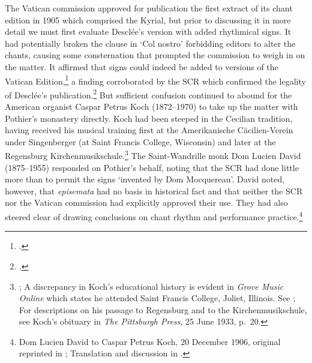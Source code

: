 %
The Vatican commission approved for publication the first extract of its chant edition in 1905 which comprised the Kyrial, but prior to discussing it in more detail we must first evaluate Desclée's version with added rhythmical signs.
It had potentially broken the clause in `Col nostro' forbidding editors to alter the chants, causing some consternation that prompted the commission to weigh in on the matter.
It affirmed that signs could indeed be added to versions of the Vatican Edition,\footcites[286]{CombeHistoirerestaurationchant1969}[253]{CombeRestorationGregorianChant2003} a finding corroborated by the SCR which confirmed the legality of Desclée's publication.\footcite[158--9]{BergeronDecadentEnchantmentsRevival1998}
But sufficient confusion continued to abound for the American organist Caspar Petrus Koch (1872--1970) to take up the matter with Pothier's monastery directly.
Koch had been steeped in the Cecilian tradition, having received his musical training first at the Amerikanische Cäcilien-Verein under Singenberger (at Saint Francis College, Wisconsin) and later at the Regensburg Kirchenmusikschule.\footnote{\cite[198--200]{SkerisMusicasacraArchdiocese2010}; A discrepancy in Koch's educational history is evident in \emph{Grove Music Online} which states he attended Saint Francis College, Joliet, Illinois. See \cite{GotwalsKochCaspar}; For descriptions on his passage to Regensburg and to the Kirchenmusikschule, see Koch's obituary in \emph{The Pittsburgh Press}, 25 June 1933, p.~20.}
The Saint-Wandrille monk Dom Lucien David (1875--1955) responded on Pothier's behalf, noting that the SCR had done little more than to permit the signs `invented by Dom Mocquereau'.
David noted, however, that \emph{episemata} had no basis in historical fact and that neither the SCR nor the Vatican commission had explicitly approved their use.
They had also steered clear of drawing conclusions on chant rhythm and performance practice.\footnote{Dom Lucien David to Caspar Petrus Koch, 20 December 1906, original reprinted in \cite[46--7]{editionsrythmiquesSolesmes1921}; Translation and discussion in \cite[277--9]{HayburnPapalLegislationSacred1979}.}
\noclub[2]

